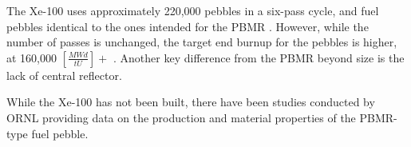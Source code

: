 The Xe-100 uses approximately 220,000 pebbles in a six-pass cycle, and fuel pebbles identical to the ones intended for the PBMR \cite{harlan_x-energy_2018}.  However, while the number of passes is unchanged, the target end burnup for the pebbles is higher, at 160,000 $\left[\frac{MWd}{tU}\right]+$ \cite{agnihotri_intrinsically_2017}.  Another key difference from the PBMR beyond size is the lack of central reflector.

While the Xe-100 has not been built, there have been studies conducted by ORNL providing data on the production and material properties of the PBMR-type fuel pebble.
